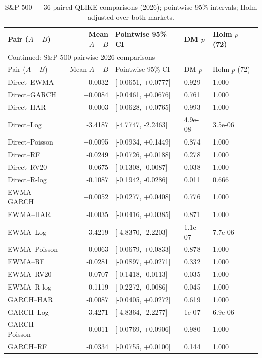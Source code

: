 \begin{longtable}{@{}lrlll@{}}
\caption{S\&P 500 --- 36 paired QLIKE comparisons (2026); pointwise 95\% intervals; Holm adjusted over both markets.}\label{tab:all-dm-expanded}\\
\toprule Pair ($A-B$) & Mean $A-B$ & Pointwise 95\% CI & DM $p$ & Holm $p$ (72)\\\midrule\endfirsthead
\multicolumn{5}{l}{\footnotesize Continued: S\&P 500 pairwise 2026 comparisons}\\\toprule
Pair ($A-B$) & Mean $A-B$ & Pointwise 95\% CI & DM $p$ & Holm $p$ (72)\\\midrule\endhead
Direct--EWMA & +0.0032 & [-0.0651, +0.0777] & 0.929 & 1.000 \\
Direct--GARCH & +0.0084 & [-0.0461, +0.0676] & 0.761 & 1.000 \\
Direct--HAR & -0.0003 & [-0.0628, +0.0765] & 0.993 & 1.000 \\
Direct--Log & -3.4187 & [-4.7747, -2.2463] & 4.9e-08 & 3.5e-06 \\
Direct--Poisson & +0.0095 & [-0.0934, +0.1449] & 0.874 & 1.000 \\
Direct--RF & -0.0249 & [-0.0726, +0.0188] & 0.278 & 1.000 \\
Direct--RV20 & -0.0675 & [-0.1308, -0.0087] & 0.038 & 1.000 \\
Direct--R-log & -0.1087 & [-0.1942, -0.0286] & 0.011 & 0.666 \\
EWMA--GARCH & +0.0052 & [-0.0277, +0.0408] & 0.776 & 1.000 \\
EWMA--HAR & -0.0035 & [-0.0416, +0.0385] & 0.871 & 1.000 \\
EWMA--Log & -3.4219 & [-4.8370, -2.2203] & 1.1e-07 & 7.7e-06 \\
EWMA--Poisson & +0.0063 & [-0.0679, +0.0833] & 0.878 & 1.000 \\
EWMA--RF & -0.0281 & [-0.0897, +0.0271] & 0.332 & 1.000 \\
EWMA--RV20 & -0.0707 & [-0.1418, -0.0113] & 0.035 & 1.000 \\
EWMA--R-log & -0.1119 & [-0.2272, -0.0086] & 0.045 & 1.000 \\
GARCH--HAR & -0.0087 & [-0.0405, +0.0272] & 0.619 & 1.000 \\
GARCH--Log & -3.4271 & [-4.8364, -2.2277] & 1e-07 & 6.9e-06 \\
GARCH--Poisson & +0.0011 & [-0.0769, +0.0906] & 0.980 & 1.000 \\
GARCH--RF & -0.0334 & [-0.0755, +0.0100] & 0.144 & 1.000 \\

\end{longtable}
